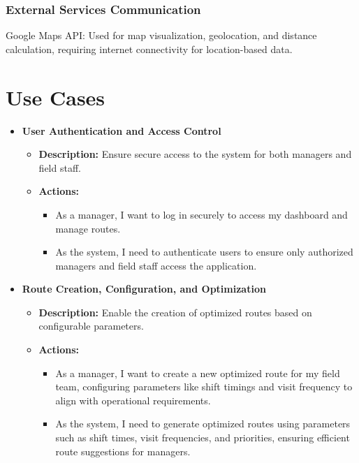 \subsubsection{External Services Communication}
Google Maps API: Used for map visualization, geolocation, and distance calculation, requiring internet connectivity for location-based data.


\section{Use Cases}
\begin{itemize}
    \item \textbf{User Authentication and Access Control}
    \begin{itemize}
        \item \textbf{Description:} Ensure secure access to the system for both managers and field staff.
        \item \textbf{Actions:}
        \begin{itemize}
            \item As a manager, I want to log in securely to access my dashboard and manage routes.
            \item As the system, I need to authenticate users to ensure only authorized managers and field staff access the application.
        \end{itemize}
    \end{itemize}
    
    \item \textbf{Route Creation, Configuration, and Optimization}
    \begin{itemize}
        \item \textbf{Description:} Enable the creation of optimized routes based on configurable parameters.
        \item \textbf{Actions:}
        \begin{itemize}
            \item As a manager, I want to create a new optimized route for my field team, configuring parameters like shift timings and visit frequency to align with operational requirements.
            \item As the system, I need to generate optimized routes using parameters such as shift times, visit frequencies, and priorities, ensuring efficient route suggestions for managers.
        \end{itemize}
    \end{itemize}
    

\end{itemize}
